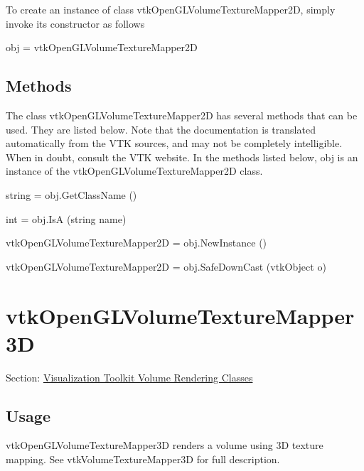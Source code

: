 To create an instance of class vtk\-Open\-G\-L\-Volume\-Texture\-Mapper2\-D, simply invoke its constructor as follows \begin{DoxyVerb}  obj = vtkOpenGLVolumeTextureMapper2D
\end{DoxyVerb}
 \hypertarget{vtkwidgets_vtkxyplotwidget_Methods}{}\subsection{Methods}\label{vtkwidgets_vtkxyplotwidget_Methods}
The class vtk\-Open\-G\-L\-Volume\-Texture\-Mapper2\-D has several methods that can be used. They are listed below. Note that the documentation is translated automatically from the V\-T\-K sources, and may not be completely intelligible. When in doubt, consult the V\-T\-K website. In the methods listed below, {\ttfamily obj} is an instance of the vtk\-Open\-G\-L\-Volume\-Texture\-Mapper2\-D class. 
\begin{DoxyItemize}
\item {\ttfamily string = obj.\-Get\-Class\-Name ()}  
\item {\ttfamily int = obj.\-Is\-A (string name)}  
\item {\ttfamily vtk\-Open\-G\-L\-Volume\-Texture\-Mapper2\-D = obj.\-New\-Instance ()}  
\item {\ttfamily vtk\-Open\-G\-L\-Volume\-Texture\-Mapper2\-D = obj.\-Safe\-Down\-Cast (vtk\-Object o)}  
\end{DoxyItemize}\hypertarget{vtkvolumerendering_vtkopenglvolumetexturemapper3d}{}\section{vtk\-Open\-G\-L\-Volume\-Texture\-Mapper3\-D}\label{vtkvolumerendering_vtkopenglvolumetexturemapper3d}
Section\-: \hyperlink{sec_vtkvolumerendering}{Visualization Toolkit Volume Rendering Classes} \hypertarget{vtkwidgets_vtkxyplotwidget_Usage}{}\subsection{Usage}\label{vtkwidgets_vtkxyplotwidget_Usage}
vtk\-Open\-G\-L\-Volume\-Texture\-Mapper3\-D renders a volume using 3\-D texture mapping. See vtk\-Volume\-Texture\-Mapper3\-D for full description.

